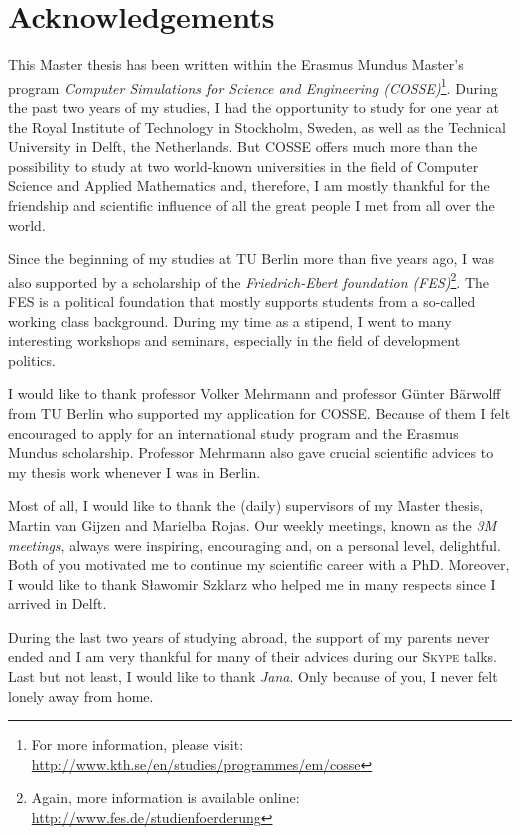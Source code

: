 \thispagestyle{empty}
\chapter{Acknowledgements}
\large{

This Master thesis has been written within the Erasmus Mundus Master's program \textit{Computer Simulations for Science and Engineering (COSSE)}\footnote{For more information, please visit: \url{http://www.kth.se/en/studies/programmes/em/cosse}}. During the past two years of my studies, I had the opportunity to study for one year at the Royal Institute of Technology in Stockholm, Sweden, as well as the Technical University in Delft, the Netherlands. But COSSE offers much more than the possibility to study at two world-known universities in the field of Computer Science and Applied Mathematics and, therefore, I am mostly thankful for the friendship and scientific influence of all the great people I met from all over the world.

Since the beginning of my studies at TU Berlin more than five years ago, I was also supported by a scholarship of the \textit{Friedrich-Ebert foundation (FES)}\footnote{Again, more information is available online: \url{http://www.fes.de/studienfoerderung}}. The FES is a political foundation that mostly supports students from a so-called working class background. During my time as a stipend, I went to many interesting workshops and seminars, especially in the field of development politics.

I would like to thank professor Volker Mehrmann and professor G\"unter B\"arwolff from TU Berlin who supported my application for COSSE. Because of them I felt encouraged to apply for an international study program and the Erasmus Mundus scholarship. Professor Mehrmann also gave crucial scientific advices to my thesis work whenever I was in Berlin.

Most of all, I would like to thank the (daily) supervisors of my Master thesis, Martin van Gijzen and Marielba Rojas. Our weekly meetings, known as the \textit{3M meetings}, always were inspiring, encouraging and, on a personal level, delightful. Both of you motivated me to continue my scientific career with a PhD. Moreover, I would like to thank S\l awomir Szklarz who helped me in many respects since I arrived in Delft.

During the last two years of studying abroad, the support of my parents never ended and I am very thankful for many of their advices during our \textsc{Skype} talks. Last but not least, I would like to thank \textit{Jana}. Only because of you, I never felt lonely away from home.
} 